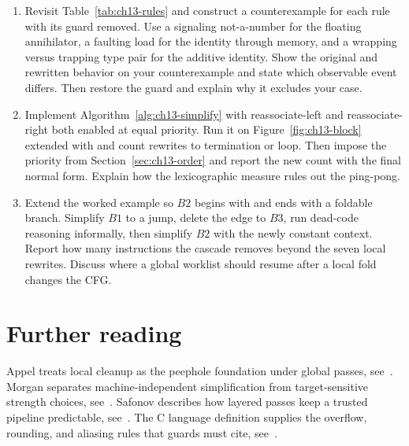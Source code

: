 \begin{enumerate}
\item \label{ex:ch13-guard-break} Revisit Table~\ref{tab:ch13-rules} and construct a counterexample for each rule with its guard removed.
Use a signaling not-a-number for the floating annihilator, a faulting load for the identity through memory, and a wrapping versus trapping type pair for the additive identity.
Show the original and rewritten behavior on your counterexample and state which observable event differs.
Then restore the guard and explain why it excludes your case.
\item \label{ex:ch13-measure-fight} Implement Algorithm~\ref{alg:ch13-simplify} with reassociate-left and reassociate-right both enabled at equal priority.
Run it on Figure~\ref{fig:ch13-block} extended with  and count rewrites to termination or loop.
Then impose the priority from Section~\ref{sec:ch13-order} and report the new count with the final normal form.
Explain how the lexicographic measure rules out the ping-pong.
\item \label{ex:ch13-branch-cascade} Extend the worked example so $B2$ begins with  and ends with a foldable branch.
Simplify $B1$ to a jump, delete the edge to $B3$, run dead-code reasoning informally, then simplify $B2$ with the newly constant context.
Report how many instructions the cascade removes beyond the seven local rewrites.
Discuss where a global worklist should resume after a local fold changes the CFG.
\end{enumerate}

\section{Further reading}
\label{sec:ch13-reading}

Appel treats local cleanup as the peephole foundation under global passes, see~\cite{appel-1998-modern}.
Morgan separates machine-independent simplification from target-sensitive strength choices, see~\cite{morgan-1998-optimizing}.
Safonov describes how layered passes keep a trusted pipeline predictable, see~\cite{safonov-2010-trustworthy}.
The C language definition supplies the overflow, rounding, and aliasing rules that guards must cite, see~\cite{wg14-2011-c11}.
